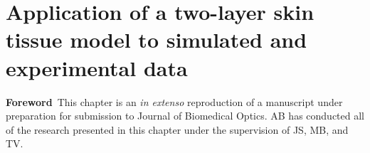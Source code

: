 







\chapter[Application of a two-layer skin tissue model]{Application of a two-layer skin tissue model to simulated and experimental data}\label{chap:2layer}

\begin{center}
\begin{minipage}[b]{0.9\linewidth}
\small
\textbf{Foreword\,}
This chapter is an \emph{in extenso} reproduction of a manuscript under preparation for submission to Journal of Biomedical Optics. 
\newline
AB has conducted all of the research presented in this chapter under the supervision of JS, MB, and TV. 
\end{minipage}
\end{center}

